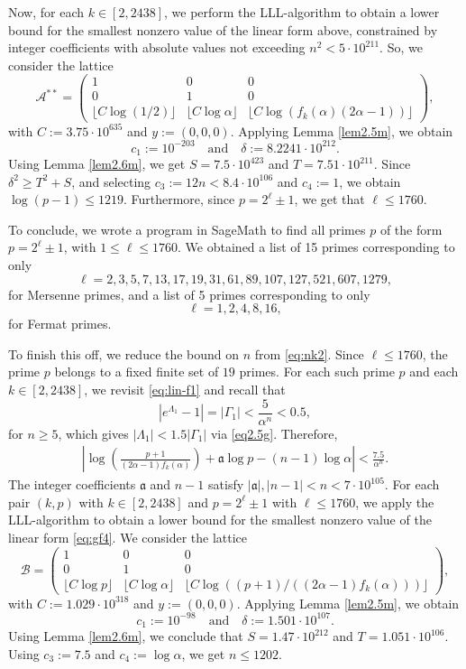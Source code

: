\documentclass[11pt,a4paper]{article}
\numberwithin{equation}{section}
\numberwithin{table}{section}
\numberwithin{figure}{section}
\begin{document}
Now, for each $k \in [2,2438]$, we perform the LLL-algorithm to obtain a lower bound for the smallest nonzero value of the linear form above, constrained by integer coefficients with absolute values not exceeding $n^2 < 5 \cdot 10^{211}$. So, we consider the lattice  
\[
\mathcal{A^{**}} = \begin{pmatrix} 
	1 & 0 & 0 \\ 
	0 & 1 & 0 \\ 
	\lfloor C\log (1/2)\rfloor & \lfloor C\log \alpha \rfloor & \lfloor C\log \left(f_k(\alpha)(2\alpha - 1)\right) \rfloor
\end{pmatrix},
\]
with $C := 3.75\cdot 10^{635}$ and $y := (0,0,0)$. Applying Lemma \ref{lem2.5m}, we obtain 
\[
c_1 := 10^{-203} \quad \text{and} \quad \delta := 8.2241\cdot 10^{212}. 
\]
Using Lemma \ref{lem2.6m}, we get $S =7.5 \cdot 10^{423}$ and $T = 7.51 \cdot 10^{211}$. Since $\delta^2 \geq T^2 + S$, and selecting $c_3 := 12n<8.4\cdot 10^{106}$ and $c_4 := 1$, we obtain $\log (p-1) \leq 1219$. Furthermore, since $p=2^\ell \pm 1$, we get that $\ell \le 1760$.

To conclude, we wrote a program in SageMath to find all primes $p$ of the form $p=2^\ell \pm 1$, with $1\le \ell \le 1760$. We obtained a list of 15 primes corresponding to only 
$$\ell =2,3,5,7,13,17,19,31,61,89,107,127,521,607,1279,$$ 
for Mersenne primes, and a list of 5 primes corresponding to only 
$$\ell = 1,2,4,8,16,$$
for Fermat primes. 

To finish this off, we reduce the bound on $n$ from \eqref{eq:nk2}. Since $\ell \leq 1760$, the prime $p$ belongs to a fixed finite set of $19$ primes. For each such prime $p$ and each $k \in [2, 2438]$, we revisit \eqref{eq:lin-f1} and recall that
\[
\left| e^{\Lambda_1} - 1 \right| = |\Gamma_1| < \dfrac{5}{\alpha^n} < 0.5,
\]
for $n \geq 5$, which gives $|\Lambda_1| < 1.5|\Gamma_1|$ via \eqref{eq2.5g}. Therefore,
\begin{align}\label{eq:gf4}
	\left| \log\left(\frac{p+1}{(2\alpha-1)f_k(\alpha)}\right) 
	+ \mathfrak{a}\log p - (n-1)\log\alpha \right| < \frac{7.5}{\alpha^n}.
\end{align}
The integer coefficients $\mathfrak{a}$ and $n-1$ satisfy $|\mathfrak{a}|, |n-1| < n < 7\cdot 10^{105}$. For each pair $(k, p)$ with $k \in [2, 2438]$ and $p = 2^{\ell}\pm 1$ with $\ell \leq 1760$, we apply the LLL-algorithm to obtain a lower bound for the smallest nonzero value of the linear form \eqref{eq:gf4}. We consider the lattice
\[
\mathcal{B} = \begin{pmatrix}
	1 & 0 & 0 \\
	0 & 1 & 0 \\
	\lfloor C\log p \rfloor & \lfloor C\log\alpha \rfloor & 
	\lfloor C\log\left((p+1)/((2\alpha-1)f_k(\alpha))\right) \rfloor
\end{pmatrix},
\]
with $C := 1.029\cdot 10^{318}$ and $y := (0,0,0)$. Applying Lemma \ref{lem2.5m}, we obtain 
\[
c_1 := 10^{-98} \quad \text{and} \quad \delta := 1.501\cdot 10^{107}. 
\]
Using Lemma \ref{lem2.6m}, we conclude that $S =1.47 \cdot 10^{212}$ and $T = 1.051 \cdot 10^{106}$. Using $c_3 := 7.5$ and $c_4 := \log \alpha$, we get $n \leq 1202$.
\end{document}
